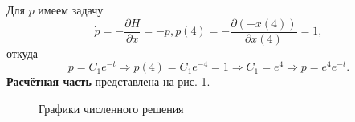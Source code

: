 \documentclass[a4paper, 12pt]{article}
\newcommand{\df}[2]{\frac{\partial #1}{\partial #2}}
\begin{document}
Для $p$ имеем задачу
\begin{equation}
    \dot p = - \df{H}{x}=-p,p(4)=-\df{(-x(4))}{x(4)}=1,
\end{equation}
откуда 
\begin{equation}
    p=C_1 e^{-t} \Rightarrow p(4) = C_1 e^{-4} = 1 \Rightarrow C_1=e^4 \Rightarrow p= e^4 e^{-t}.
\end{equation}
{\bf Расчётная часть} представлена на рис. \ref{31}.
\begin{figure}[h]
    \noindent{}
    \caption{Графики численного решения}
    \label{31}
\end{figure}
\end{document}

